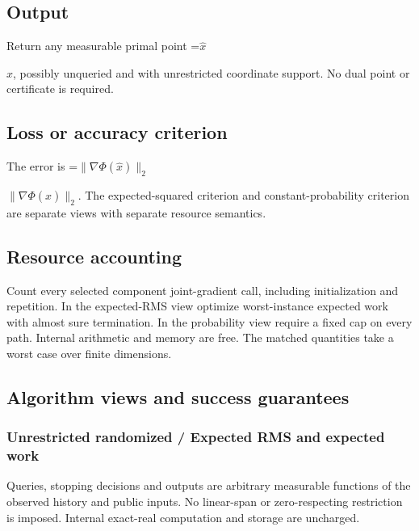 \documentclass[10pt,a4paper]{article}
\newcommand{\AtlasMath}[1]{\par\begingroup\centering\setbox0=\hbox{$\displaystyle #1$}\ifdim\wd0>1.4\linewidth\typeout{ATLAS WIDE FORMULA: \the\wd0}\fi\ifdim\wd0>\linewidth\resizebox{\linewidth}{!}{\box0}\else\box0\fi\par\endgroup}
\newcommand{\AtlasInlineMath}[1]{\begingroup\setbox0=\hbox{$#1$}\ifdim\wd0>.4\linewidth\endgroup\AtlasMath{#1}\else\endgroup$#1$\fi}
\begin{document}
\subsection{Output}


Return any measurable primal point \AtlasInlineMath{\widehat x}, possibly unqueried and with unrestricted coordinate support. No dual point or certificate is required.



\subsection{Loss or accuracy criterion}


The error is \AtlasInlineMath{\|\nabla\Phi(\widehat x)\|_2}. The expected-squared criterion and constant-probability criterion are separate views with separate resource semantics.



\subsection{Resource accounting}


Count every selected component joint-gradient call, including initialization and repetition. In the expected-RMS view optimize worst-instance expected work with almost sure termination. In the probability view require a fixed cap on every path. Internal arithmetic and memory are free. The matched quantities take a worst case over finite dimensions.



\subsection{Algorithm views and success guarantees}


\subsubsection{Unrestricted randomized / Expected RMS and expected work}


Queries, stopping decisions and outputs are arbitrary measurable functions of the observed history and public inputs. No linear-span or zero-respecting restriction is imposed. Internal exact-real computation and storage are uncharged.
\end{document}
